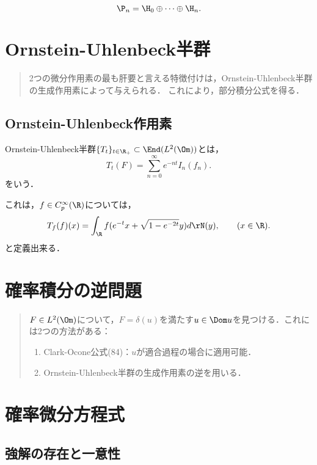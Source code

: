 \documentclass[uplatex,dvipdfmx]{jsreport}
\begin{document}
\begin{proposition}
    \[\P_n=\H_0\oplus\cdots\oplus\H_n.\]
\end{proposition}

\chapter{Ornstein-Uhlenbeck半群}

\begin{quotation}
    2つの微分作用素の最も肝要と言える特徴付けは，Ornstein-Uhlenbeck半群の生成作用素によって与えられる．
    これにより，部分積分公式を得る．
\end{quotation}

\section{Ornstein-Uhlenbeck作用素}

\begin{definition}
    Ornstein-Uhlenbeck半群$\{T_t\}_{t\in\R_+}\subset \End(L^2(\Om))$とは，
    \[T_t(F)=\sum_{n=0}^\infty e^{-nt}I_n(f_n).\]
    をいう．
\end{definition}
\begin{remarks}
    これは，$f\in C_p^\infty(\R)$については，
    \[T_f(f)(x)=\int_\R f(e^{-t}x+\sqrt{1-e^{-2t}}y)d\rN(y),\qquad(x\in\R).\]
    と定義出来る．
\end{remarks}

\chapter{確率積分の逆問題}

\begin{quotation}
    $F\in L^2(\Om)$について，$F=\delta(u)$を満たす$u\in\Dom u$を見つける．これには2つの方法がある：
    \begin{enumerate}
        \item Clark-Ocone公式(84)：$u$が適合過程の場合に適用可能．
        \item Ornstein-Uhlenbeck半群の生成作用素の逆を用いる．
    \end{enumerate}
\end{quotation}

\chapter{確率微分方程式}

\section{強解の存在と一意性}
\end{document}
